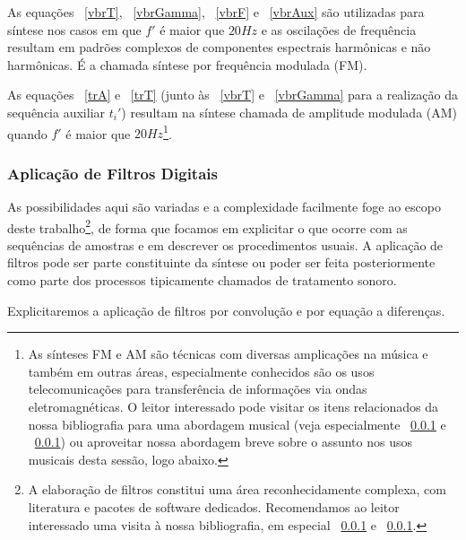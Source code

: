 As equações ~\ref{vbrT}, ~\ref{vbrGamma}, ~\ref{vbrF} e ~\ref{vbrAux}
são utilizadas para síntese nos casos em que $f'$ é
maior que $20Hz$ e as oscilações de frequência resultam em padrões complexos
de componentes espectrais harmônicas e não harmônicas. É a chamada síntese
por frequência modulada (FM).

As equações ~\ref{trA} e ~\ref{trT}
(junto às ~\ref{vbrT} e ~\ref{vbrGamma} para a realização da sequência auxiliar $t_i'$) 
resultam na síntese chamada de amplitude modulada (AM)
quando $f'$ é maior que $20Hz$\footnote{As sínteses
FM e AM são técnicas com diversas amplicações na música e também em outras áreas,
especialmente conhecidos são os usos telecomunicações para transferência de informações
via ondas eletromagnéticas. O leitor interessado pode visitar os itens relacionados
da nossa bibliografia para uma abordagem musical (veja especialmente ~\ref{} e ~\ref{})
ou aproveitar nossa abordagem breve sobre o assunto nos usos musicais desta sessão, logo abaixo.}.

\subsubsection{Aplicação de Filtros Digitais}
 As possibilidades
aqui são variadas e a complexidade facilmente
foge ao escopo deste trabalho\footnote{A elaboração de filtros
constitui uma área reconhecidamente complexa, com literatura
e pacotes de software dedicados. 
Recomendamos ao leitor
interessado uma visita à nossa bibliografia, em especial ~\ref{} e ~\ref{}.},
de forma que focamos em explicitar o que ocorre com as sequências
de amostras e em descrever os procedimentos usuais.
A aplicação de filtros pode
ser parte constituinte da síntese ou poder ser feita posteriormente
como parte dos processos tipicamente chamados de tratamento sonoro.

Explicitaremos a aplicação de filtros por convolução
e por equação a diferenças.

